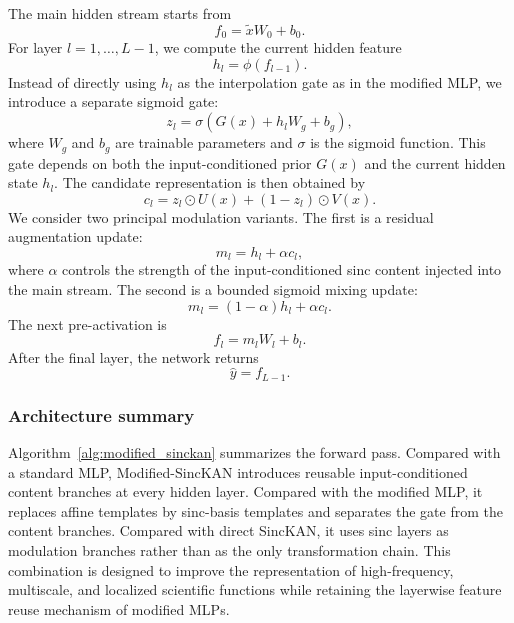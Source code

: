 \documentclass[preprint,12pt]{elsarticle}
\begin{document}
The main hidden stream starts from
\begin{equation}
  f_0 = \tilde{x}W_0 + b_0.
\end{equation}
For layer \(l=1,\ldots,L-1\), we compute the current hidden feature
\begin{equation}
  h_l = \phi(f_{l-1}).
\end{equation}
Instead of directly using \(h_l\) as the interpolation gate as in the modified MLP, we introduce a separate sigmoid gate:
\begin{equation}
  z_l = \sigma\left(G(x) + h_l W_g + b_g\right),
\end{equation}
where \(W_g\) and \(b_g\) are trainable parameters and \(\sigma\) is the sigmoid function. This gate depends on both the input-conditioned prior \(G(x)\) and the current hidden state \(h_l\). The candidate representation is then obtained by
\begin{equation}
  c_l = z_l \odot U(x) + \left(1-z_l\right)\odot V(x).
\end{equation}
We consider two principal modulation variants. The first is a residual augmentation update:
\begin{equation}
  m_l = h_l + \alpha c_l,
  \label{eq:separate_residual}
\end{equation}
where \(\alpha\) controls the strength of the input-conditioned sinc content injected into the main stream. The second is a bounded sigmoid mixing update:
\begin{equation}
  m_l = (1-\alpha)h_l + \alpha c_l.
  \label{eq:separate_sigmoid}
\end{equation}
The next pre-activation is
\begin{equation}
  f_l = m_l W_l + b_l.
\end{equation}
After the final layer, the network returns
\begin{equation}
  \hat{y} = f_{L-1}.
\end{equation}

\subsubsection{Architecture summary}

Algorithm~\ref{alg:modified_sinckan} summarizes the forward pass. Compared with a standard MLP, Modified-SincKAN introduces reusable input-conditioned content branches at every hidden layer. Compared with the modified MLP, it replaces affine templates by sinc-basis templates and separates the gate from the content branches. Compared with direct SincKAN, it uses sinc layers as modulation branches rather than as the only transformation chain. This combination is designed to improve the representation of high-frequency, multiscale, and localized scientific functions while retaining the layerwise feature reuse mechanism of modified MLPs.
\end{document}
